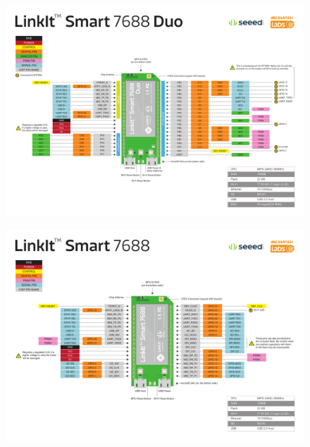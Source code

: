 \documentclass{beamer}
\begin{document}
\begin{frame}
  \begin{figure}
    \includegraphics[height=\textheight,width=\textwidth,keepaspectratio]{pin.pdf}
  \end{figure}
\end{frame}

\begin{frame}
  \begin{figure}
    \includegraphics[height=\textheight,width=\textwidth,keepaspectratio]{pin2.pdf}
  \end{figure}
\end{frame}
\end{document}
